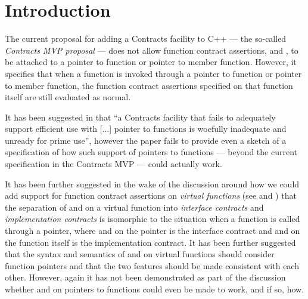 
\tableofcontents*





\section{Introduction}
\label{sec:intro}

The current proposal \cite{P2900R7} for adding a Contracts facility to C++ --- the so-called \emph{Contracts MVP proposal} --- does not allow function contract assertions,  and , to be attached to a pointer to function or pointer to member function. However, it specifies that when a function is invoked through a pointer to function or pointer to member function, the function contract assertions specified on that function itself are still evaluated as normal.

It has been suggested in \cite{P3173R0} that ``a Contracts facility that fails to adequately support efficient use with [...] pointer to functions is woefully inadequate and unready for prime use'', however the paper fails to provide even a sketch of a specification of how such support of pointers to functions --- beyond the current specification in the Contracts MVP --- could actually work.

It has been further suggested in the wake of the discussion around how we could add support for function contract assertions on \emph{virtual functions} (see \cite{P3097R0} and \cite{P3165R0}) that the separation of  and  on a virtual function into \emph{interface contracts} and \emph{implementation contracts} is isomorphic to the situation when a function is called through a pointer, where  and  on the pointer is the interface contract and  and  on the function itself is the implementation contract. It has been further suggested that the syntax and semantics of  and  on virtual functions should consider function pointers and that the two features should be made consistent with each other. However, again it has not been demonstrated as part of the discussion whether  and  on pointers to functions could even be made to work, and if so, how.

